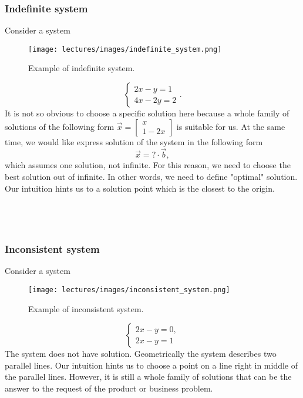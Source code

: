 \subsubsection*{Indefinite system}
    \Ex Consider a system~~~~~~~~~~~~~~~~~~~~~~~~~~~~~~~~~~~~~~~
    \begin{wrapfigure}[15]{r}{0.4\columnwidth}
        \texttt{[image: lectures/images/indefinite\_system.png]}
        \caption*{\scriptsize{Example of indefinite system.}}
    \end{wrapfigure}
    \[
        \left\{
            \begin{array}{l}
                2x-y=1\\
                4x-2y=2
            \end{array}.
        \right.  
    \]
    It is not so obvious to choose a specific solution here because a whole family of solutions of the following form 
    $\vec{x} = 
    \begin{bmatrix}
        x\\1-2x
    \end{bmatrix}$ is suitable for us. At the same time, we would like express solution of the system in the following form
    \[
        \vec{x} = ?\cdot \vec{b},
    \]
    which assumes one solution, not infinite. For this reason, we need to choose the best solution out of infinite. In other words, we need to define "optimal" solution. Our intuition hints us to a solution point which is the closest to the origin. \\\\\\\\
    

\subsubsection*{Inconsistent system}    
     \Ex Consider a system~~~~~~~~~~~~~~~~~~~~~~~~~~~~~~~~~~~~~~~
        \begin{wrapfigure}[8]{r}{0.4\columnwidth}
            \texttt{[image: lectures/images/inconsistent\_system.png]}
            \caption*{\scriptsize{Example of inconsistent system.}}
            \label{fig:inconsistent_with_vectors}
        \end{wrapfigure}  
        $$
            \left\{
                \begin{array}{c}
                    2x-y=0,\\
                    2x-y=1
                \end{array}
            \right.  
        $$
        The system does not have solution. Geometrically the system describes two parallel lines. Our intuition hints us to choose a point on a line right in middle of the parallel lines. However, it is still a whole family of solutions that can be the answer to the request of the product or business problem. 
        \newpage
